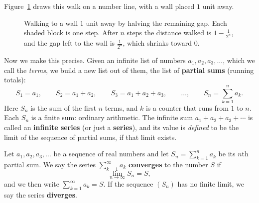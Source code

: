 Figure~\ref{ch29:fig-wall} draws this walk on a number line, with a wall placed $1$ unit away.

\begin{figure}[htbp]
\centering
{}
\caption{Walking to a wall $1$ unit away by halving the remaining gap. Each shaded block is one step. After $n$ steps the distance walked is $1 - \tfrac{1}{2^n}$, and the gap left to the wall is $\tfrac{1}{2^n}$, which shrinks toward $0$.}
\label{ch29:fig-wall}
\end{figure}

Now we make this precise. Given an infinite list of numbers $a_1, a_2, a_3, \dots$, which we call the \emph{terms}, we build a new list out of them, the list of \textbf{partial sums} (running totals):
\[
S_1 = a_1, \qquad
S_2 = a_1 + a_2, \qquad
S_3 = a_1 + a_2 + a_3, \qquad \dots, \qquad
S_n = \sum_{k=1}^{n} a_k .
\]
Here $S_n$ is the sum of the first $n$ terms, and $k$ is a counter that runs from $1$ to $n$. Each $S_n$ is a finite sum: ordinary arithmetic. The infinite sum $a_1 + a_2 + a_3 + \cdots$ is called an \textbf{infinite series} (or just a \textbf{series}), and its value is \emph{defined} to be the limit of the sequence of partial sums, if that limit exists.

\begin{definition}
\label{ch29:def-convergence}
Let $a_1, a_2, a_3, \dots$ be a sequence of real numbers and let $S_n = \sum_{k=1}^n a_k$ be its $n$th partial sum. We say the series $\sum_{k=1}^{\infty} a_k$ \textbf{converges} to the number $S$ if
\[
\lim_{n \to \infty} S_n = S,
\]
and we then write $\sum_{k=1}^{\infty} a_k = S$. If the sequence $(S_n)$ has no finite limit, we say the series \textbf{diverges}.
\end{definition}

